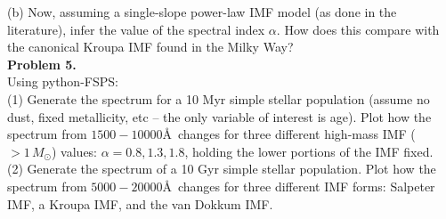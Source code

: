 \documentclass{article}
\begin{document}
(b) Now, assuming a single-slope power-law IMF model (as done in the literature), infer the value of the spectral index $\alpha$.  How does this compare with the canonical Kroupa IMF found in the Milky Way?  \\


\noindent \textbf{Problem 5.} \\ 

Using python-FSPS: \\

(1) Generate the spectrum for a 10 Myr simple stellar population (assume no dust, fixed metallicity, etc -- the only variable of interest is age). Plot how the spectrum from $1500- 10000$\AA\ changes for three different high-mass IMF ($>1\, M_{\odot}$) values: $\alpha=0.8, 1.3, 1.8$, holding the lower portions of the IMF fixed.  \\

(2) Generate the spectrum of a 10 Gyr simple stellar population.  Plot how the spectrum from $5000-20000$\AA\ changes for three different IMF forms: Salpeter IMF, a Kroupa IMF, and the van Dokkum IMF. 
\end{document}
